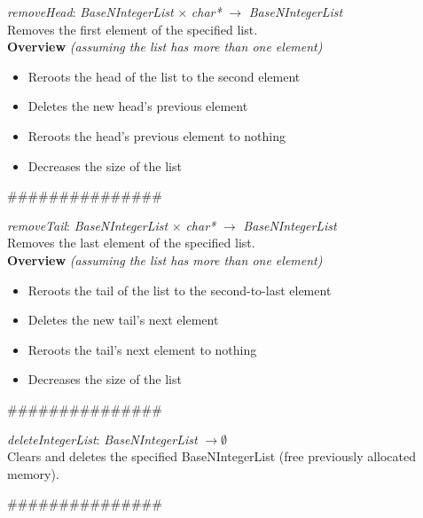 \documentclass[book, backcover, english, nodocumentinfo]{upmethodology-document}
\newcommand{\nxtalgo}{\centerline{$$$$\#\#\#\#\#\#\#\#\#\#\#\#\#\#\#$$$$}}
\newcommand{\ov}{\textbf{Overview}}
\begin{document}
		\begin{minipage}{\linewidth}
			\textit{removeHead}: \textit{BaseNIntegerList} $\times$ \textit{char*} $\rightarrow$ \textit{BaseNIntegerList}\\
			Removes the first element of the specified list.\\
			\ov \textit{ (assuming the list has more than one element)}
			\begin{itemize}
				\item Reroots the head of the list to the second element
				\item Deletes the new head's previous element
				\item Reroots the head's previous element to nothing
				\item Decreases the size of the list
			\end{itemize}
			\label{algo:BNIL-RemoveHead}
			
		\end{minipage}
		\nxtalgo{}

		\begin{minipage}{\linewidth}
			\textit{removeTail}: \textit{BaseNIntegerList} $\times$ \textit{char*} $\rightarrow$ \textit{BaseNIntegerList}\\
			Removes the last element of the specified list.\\
			\ov \textit{ (assuming the list has more than one element)}
			\begin{itemize}
				\item Reroots the tail of the list to the second-to-last element
				\item Deletes the new tail's next element
				\item Reroots the tail's next element to nothing
				\item Decreases the size of the list
			\end{itemize}
			\label{algo:BNIL-RemoveTail}
			
		\end{minipage}
		\nxtalgo{}

		\begin{minipage}{\linewidth}
			\textit{deleteIntegerList}: \textit{BaseNIntegerList} $\rightarrow \emptyset$\\
			Clears and deletes the specified BaseNIntegerList (free previously allocated memory).\\
			\label{algo:BNIL-DeleteIntegerList}
			
		\end{minipage}
		\nxtalgo{}
\end{document}
